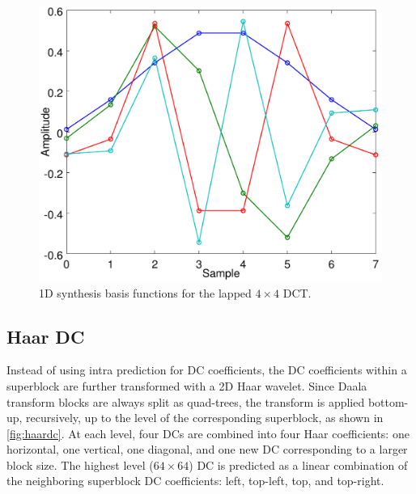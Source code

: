 \documentclass[english,conference,10pt]{IEEEtran}
\begin{document}
\begin{figure}
\centering
\includegraphics[width=0.8\columnwidth]{basis4}
\caption{1D synthesis basis functions for the lapped $4 \times 4$ DCT.\label{fig:basis4}}
\end{figure}

\subsection{Haar DC}

Instead of using intra prediction for DC coefficients, the DC coefficients
within a superblock are further transformed with a 2D Haar wavelet.
Since Daala transform blocks are always split as quad-trees, the transform is
applied bottom-up, recursively, up to the level of the corresponding superblock,
as shown in \cref{fig:haardc}.
At each level, four DCs are combined into four Haar coefficients: one horizontal,
one vertical, one diagonal, and one new DC corresponding to a larger block size.
The highest level ($64\times 64$) DC is predicted as a linear combination of the
neighboring superblock DC coefficients: left, top-left, top, and top-right.
\end{document}
